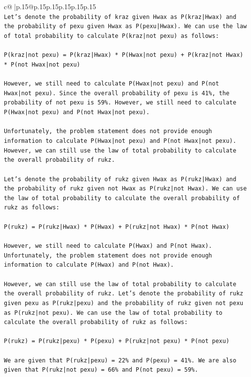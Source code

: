 \documentclass{article}
\begin{document}
{\begin{supertabular}{c@{$\;$}|p{.15\linewidth}@{}p{.15\linewidth}p{.15\linewidth}p{.15\linewidth}p{.15\linewidth}p{.15\linewidth}}
{{{\\ 
\texttt{Let's denote the probability of kraz given Hwax as P(kraz|Hwax) and the probability of pexu given Hwax as P(pexu|Hwax). We can use the law of total probability to calculate P(kraz|not pexu) as follows:} \\
\\ 
\texttt{P(kraz|not pexu) = P(kraz|Hwax) * P(Hwax|not pexu) + P(kraz|not Hwax) * P(not Hwax|not pexu)} \\
\\ 
\texttt{However, we still need to calculate P(Hwax|not pexu) and P(not Hwax|not pexu). Since the overall probability of pexu is 41\%, the probability of not pexu is 59\%. However, we still need to calculate P(Hwax|not pexu) and P(not Hwax|not pexu).} \\
\\ 
\texttt{Unfortunately, the problem statement does not provide enough information to calculate P(Hwax|not pexu) and P(not Hwax|not pexu). However, we can still use the law of total probability to calculate the overall probability of rukz.} \\
\\ 
\texttt{Let's denote the probability of rukz given Hwax as P(rukz|Hwax) and the probability of rukz given not Hwax as P(rukz|not Hwax). We can use the law of total probability to calculate the overall probability of rukz as follows:} \\
\\ 
\texttt{P(rukz) = P(rukz|Hwax) * P(Hwax) + P(rukz|not Hwax) * P(not Hwax)} \\
\\ 
\texttt{However, we still need to calculate P(Hwax) and P(not Hwax). Unfortunately, the problem statement does not provide enough information to calculate P(Hwax) and P(not Hwax).} \\
\\ 
\texttt{However, we can still use the law of total probability to calculate the overall probability of rukz. Let's denote the probability of rukz given pexu as P(rukz|pexu) and the probability of rukz given not pexu as P(rukz|not pexu). We can use the law of total probability to calculate the overall probability of rukz as follows:} \\
\\ 
\texttt{P(rukz) = P(rukz|pexu) * P(pexu) + P(rukz|not pexu) * P(not pexu)} \\
\\ 
\texttt{We are given that P(rukz|pexu) = 22\% and P(pexu) = 41\%. We are also given that P(rukz|not pexu) = 66\% and P(not pexu) = 59\%. } \\
}}}
\end{supertabular}}
\end{document}
